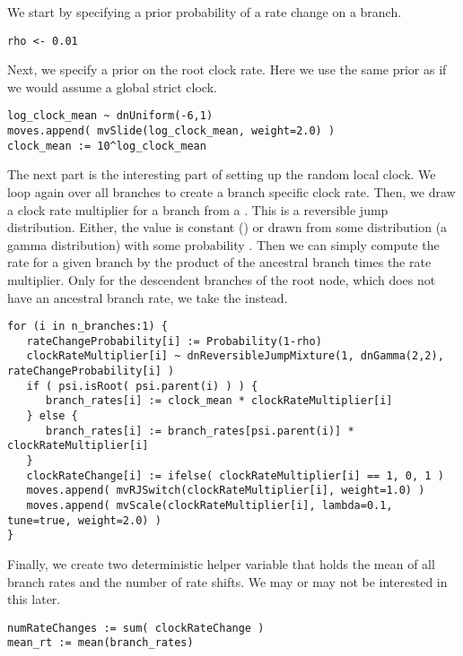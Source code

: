 We start by specifying a prior probability of a rate change on a branch.
{\tt \begin{snugshade*}
\begin{lstlisting}
rho <- 0.01
\end{lstlisting}
\end{snugshade*}}
Next, we specify a prior on the root clock rate.
Here we use the same prior as if we would assume a global strict clock.
{\tt \begin{snugshade*}
\begin{lstlisting}
log_clock_mean ~ dnUniform(-6,1)
moves.append( mvSlide(log_clock_mean, weight=2.0) )
clock_mean := 10^log_clock_mean
\end{lstlisting}
\end{snugshade*}}

The next part is the interesting part of setting up the random local clock.
We loop again over all branches to create a branch specific clock rate.
Then, we draw a clock rate multiplier for a branch from a .
This is a reversible jump distribution.
Either, the value is constant () or drawn from some distribution (\EG a gamma distribution) with some probability .
Then we can simply compute the rate for a given branch by the product of the ancestral branch times the rate multiplier.
Only for the descendent branches of the root node, which does not have an ancestral branch rate, we take the  instead.
{\tt \begin{snugshade*}
\begin{lstlisting}
for (i in n_branches:1) {
   rateChangeProbability[i] := Probability(1-rho)
   clockRateMultiplier[i] ~ dnReversibleJumpMixture(1, dnGamma(2,2), rateChangeProbability[i] )
   if ( psi.isRoot( psi.parent(i) ) ) {
      branch_rates[i] := clock_mean * clockRateMultiplier[i]
   } else {
      branch_rates[i] := branch_rates[psi.parent(i)] * clockRateMultiplier[i]
   }
   clockRateChange[i] := ifelse( clockRateMultiplier[i] == 1, 0, 1 )
   moves.append( mvRJSwitch(clockRateMultiplier[i], weight=1.0) )
   moves.append( mvScale(clockRateMultiplier[i], lambda=0.1, tune=true, weight=2.0) )
}
\end{lstlisting}
\end{snugshade*}}

Finally, we create two deterministic helper variable that holds the mean of all branch rates and the number of rate shifts.
We may or may not be interested in this later.
{\tt \begin{snugshade*}
\begin{lstlisting}
numRateChanges := sum( clockRateChange )
mean_rt := mean(branch_rates)
\end{lstlisting}
\end{snugshade*}}




